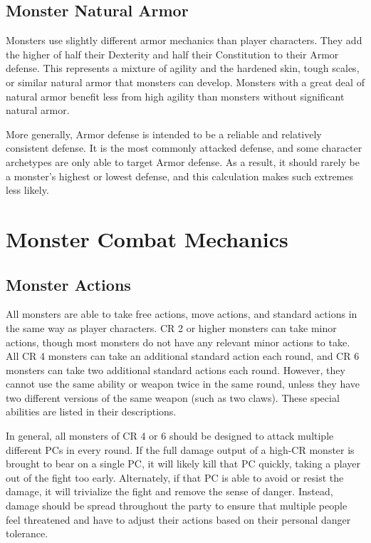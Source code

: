     \subsection{Monster Natural Armor}\label{Monster Natural Armor}
        Monsters use slightly different armor mechanics than player characters.
        They add the higher of half their Dexterity and half their Constitution to their Armor defense.
        This represents a mixture of agility and the hardened skin, tough scales, or similar natural armor that monsters can develop.
        Monsters with a great deal of natural armor benefit less from high agility than monsters without significant natural armor.

        More generally, Armor defense is intended to be a reliable and relatively consistent defense.
        It is the most commonly attacked defense, and some character archetypes are only able to target Armor defense.
        As a result, it should rarely be a monster's highest or lowest defense, and this calculation makes such extremes less likely.

\section{Monster Combat Mechanics}

    \subsection{Monster Actions}\label{Monster Actions}
        All monsters are able to take free actions, move actions, and standard actions in the same way as player characters.
        CR 2 or higher monsters can take minor actions, though most monsters do not have any relevant minor actions to take.
        All CR 4 monsters can take an additional standard action each round, and CR 6 monsters can take two additional standard actions each round.
        However, they cannot use the same ability or weapon twice in the same round, unless they have two different versions of the same weapon (such as two claws).
        These special abilities are listed in their descriptions.

        In general, all monsters of CR 4 or 6 should be designed to attack multiple different PCs in every round.
        If the full damage output of a high-CR monster is brought to bear on a single PC, it will likely kill that PC quickly, taking a player out of the fight too early.
        Alternately, if that PC is able to avoid or resist the damage, it will trivialize the fight and remove the sense of danger.
        Instead, damage should be spread throughout the party to ensure that multiple people feel threatened and have to adjust their actions based on their personal danger tolerance.


